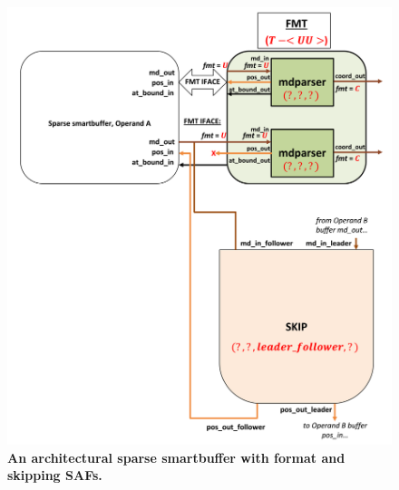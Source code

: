 \begin{figure}[H]
\includegraphics[width=\textwidth]{figures/safinference_build_04mdparserportfmt.png}
\caption{\textbf{An architectural sparse smartbuffer with format and skipping SAFs.}}
\label{fig:safinference_build_04mdparserportfmt}
\centering
\end{figure}




